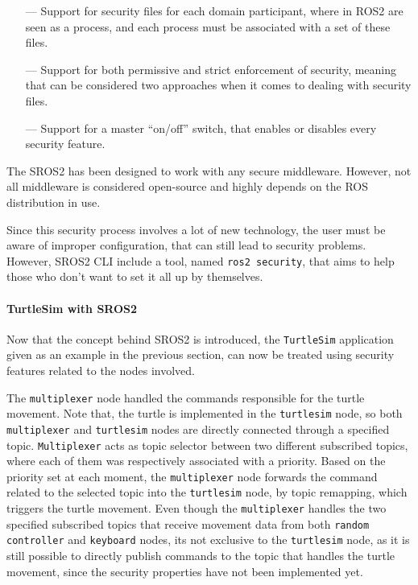 \begin{itemize}
    \item[---] Support for security files for each domain participant, where in ROS2 are seen as a process, and each process must be associated with a set of these files.
    \item[---] Support for both permissive and strict enforcement of security, meaning that can be considered two approaches when it comes to dealing with security files.
    \item[---] Support for a master “on/off” switch, that enables or disables every security feature.
\end{itemize}

The SROS2 has been designed to work with any secure middleware. However, not all middleware is considered open-source and highly depends on the ROS distribution in use.

Since this security process involves a lot of new technology, the user must be aware of improper configuration, that can still lead to security problems. However, SROS2 CLI include a tool, named \texttt{ros2 security}, that aims to help those who don’t want to set it all up by themselves.

\paragraph{TurtleSim with SROS2}
            
Now that the concept behind SROS2 is introduced, the \texttt{TurtleSim} application given as an example in the previous section, can now  be treated using security features related to the nodes involved.

The \texttt{multiplexer} node handled the commands responsible for the turtle movement. Note that, the turtle is implemented in the \texttt{turtlesim} node, so both \texttt{multiplexer} and \texttt{turtlesim} nodes are directly connected through a specified topic. \texttt{Multiplexer} acts as topic selector between two different subscribed topics, where each of them was respectively associated with a priority. Based on the priority set at each moment, the \texttt{multiplexer} node forwards the command related to the selected topic into the \texttt{turtlesim} node, by topic remapping, which triggers the turtle movement. Even though the \texttt{multiplexer} handles the two specified subscribed topics that receive movement data from both \texttt{random controller} and \texttt{keyboard} nodes, its not exclusive to the \texttt{turtlesim} node, as it is still possible to directly publish commands to the topic that handles the turtle movement, since the security properties have not been implemented yet.

